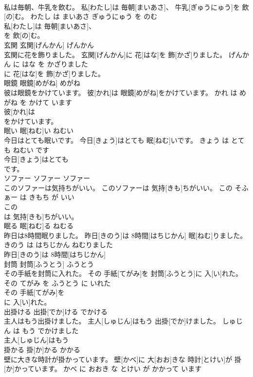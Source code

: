 \documentclass[8pt]{extreport}
\begin{document}
\begin{CJK}{UTF8}{min}
\\	私は毎朝、牛乳を飲む。	私[わたし]は 毎朝[まいあさ]、 牛乳[ぎゅうにゅう]を 飲[の]む。	わたし は まいあさ ぎゅうにゅう を のむ	
\\	私[わたし]は 毎朝[まいあさ]、
\\	を 飲[の]む。			
\\	玄関	玄関[げんかん]	げんかん	
\\	玄関に花を飾りました。	玄関[げんかん]に 花[はな]を 飾[かざ]りました。	げんかん に はな を かざりました	
\\	に 花[はな]を 飾[かざ]りました。			
\\	眼鏡	眼鏡[めがね]	めがね	
\\	彼は眼鏡をかけています。	彼[かれ]は 眼鏡[めがね]をかけています。	かれ は めがね を かけて います	
\\	彼[かれ]は
\\	をかけています。			
\\	眠い	眠[ねむ]い	ねむい	
\\	今日はとても眠いです。	今日[きょう]はとても 眠[ねむ]いです。	きょう は とても ねむい です	
\\	今日[きょう]はとても
\\	です。			
\\	ソファー	ソファー	ソファー	
\\	このソファーは気持ちがいい。	このソファーは 気持[きも]ちがいい。	この そふぁー は きもち が いい	
\\	この
\\	は 気持[きも]ちがいい。			
\\	眠る	眠[ねむ]る	ねむる	
\\	昨日は8時間眠りました。	昨日[きのう]は 8時間[はちじかん] 眠[ねむ]りました。	きのう は はちじかん ねむりました	
\\	昨日[きのう]は 8時間[はちじかん]
\\	封筒	封筒[ふうとう]	ふうとう	
\\	その手紙を封筒に入れた。	その 手紙[てがみ]を 封筒[ふうとう]に 入[い]れた。	その てがみ を ふうとう に いれた	
\\	その 手紙[てがみ]を
\\	に 入[い]れた。			
\\	出掛ける	出掛[でか]ける	でかける	
\\	主人はもう出掛けました。	主人[しゅじん]はもう 出掛[でか]けました。	しゅじん は もう でかけました	
\\	主人[しゅじん]はもう
\\	掛かる	掛[か]かる	かかる	
\\	壁に大きな時計が掛かっています。	壁[かべ]に 大[おお]きな 時計[とけい]が 掛[か]かっています。	かべ に おおき な とけい が かかって います	

\end{CJK}
\end{document}
